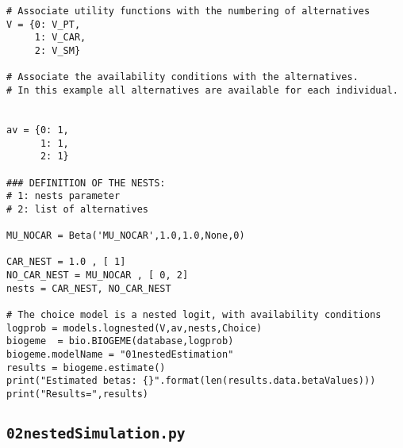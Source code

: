 \documentclass[12pt,a4paper]{article}
\begin{document}
\begin{lstlisting}[style=numbers]
# Associate utility functions with the numbering of alternatives
V = {0: V_PT,
     1: V_CAR,
     2: V_SM}

# Associate the availability conditions with the alternatives.
# In this example all alternatives are available for each individual.


av = {0: 1,
      1: 1,
      2: 1}

### DEFINITION OF THE NESTS:
# 1: nests parameter
# 2: list of alternatives

MU_NOCAR = Beta('MU_NOCAR',1.0,1.0,None,0)

CAR_NEST = 1.0 , [ 1]
NO_CAR_NEST = MU_NOCAR , [ 0, 2]
nests = CAR_NEST, NO_CAR_NEST

# The choice model is a nested logit, with availability conditions
logprob = models.lognested(V,av,nests,Choice)
biogeme  = bio.BIOGEME(database,logprob)
biogeme.modelName = "01nestedEstimation"
results = biogeme.estimate()
print("Estimated betas: {}".format(len(results.data.betaValues)))
print("Results=",results)
\end{lstlisting}

\subsection{\lstinline$02nestedSimulation.py$}
\label{sec:02nestedSimulation}
\end{document}

